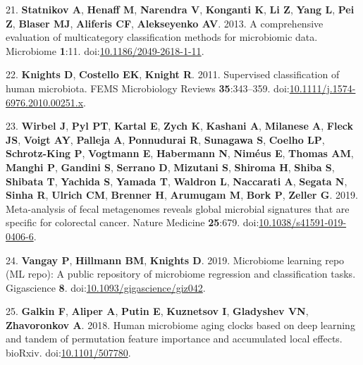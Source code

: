 \documentclass[
  11pt,
]{article}
\begin{document}
\leavevmode\hypertarget{ref-statnikov_comprehensive_2013}{}%
21. \textbf{Statnikov A}, \textbf{Henaff M}, \textbf{Narendra V},
\textbf{Konganti K}, \textbf{Li Z}, \textbf{Yang L}, \textbf{Pei Z},
\textbf{Blaser MJ}, \textbf{Aliferis CF}, \textbf{Alekseyenko AV}. 2013.
A comprehensive evaluation of multicategory classification methods for
microbiomic data. Microbiome \textbf{1}:11.
doi:\href{https://doi.org/10.1186/2049-2618-1-11}{10.1186/2049-2618-1-11}.

\leavevmode\hypertarget{ref-knights_supervised_2011}{}%
22. \textbf{Knights D}, \textbf{Costello EK}, \textbf{Knight R}. 2011.
Supervised classification of human microbiota. FEMS Microbiology Reviews
\textbf{35}:343--359.
doi:\href{https://doi.org/10.1111/j.1574-6976.2010.00251.x}{10.1111/j.1574-6976.2010.00251.x}.

\leavevmode\hypertarget{ref-wirbel_meta-analysis_2019}{}%
23. \textbf{Wirbel J}, \textbf{Pyl PT}, \textbf{Kartal E}, \textbf{Zych
K}, \textbf{Kashani A}, \textbf{Milanese A}, \textbf{Fleck JS},
\textbf{Voigt AY}, \textbf{Palleja A}, \textbf{Ponnudurai R},
\textbf{Sunagawa S}, \textbf{Coelho LP}, \textbf{Schrotz-King P},
\textbf{Vogtmann E}, \textbf{Habermann N}, \textbf{Niméus E},
\textbf{Thomas AM}, \textbf{Manghi P}, \textbf{Gandini S},
\textbf{Serrano D}, \textbf{Mizutani S}, \textbf{Shiroma H},
\textbf{Shiba S}, \textbf{Shibata T}, \textbf{Yachida S}, \textbf{Yamada
T}, \textbf{Waldron L}, \textbf{Naccarati A}, \textbf{Segata N},
\textbf{Sinha R}, \textbf{Ulrich CM}, \textbf{Brenner H},
\textbf{Arumugam M}, \textbf{Bork P}, \textbf{Zeller G}. 2019.
Meta-analysis of fecal metagenomes reveals global microbial signatures
that are specific for colorectal cancer. Nature Medicine
\textbf{25}:679.
doi:\href{https://doi.org/10.1038/s41591-019-0406-6}{10.1038/s41591-019-0406-6}.

\leavevmode\hypertarget{ref-vangay_microbiome_2019}{}%
24. \textbf{Vangay P}, \textbf{Hillmann BM}, \textbf{Knights D}. 2019.
Microbiome learning repo (ML repo): A public repository of microbiome
regression and classification tasks. Gigascience \textbf{8}.
doi:\href{https://doi.org/10.1093/gigascience/giz042}{10.1093/gigascience/giz042}.

\leavevmode\hypertarget{ref-galkin_human_2018}{}%
25. \textbf{Galkin F}, \textbf{Aliper A}, \textbf{Putin E},
\textbf{Kuznetsov I}, \textbf{Gladyshev VN}, \textbf{Zhavoronkov A}.
2018. Human microbiome aging clocks based on deep learning and tandem of
permutation feature importance and accumulated local effects. bioRxiv.
doi:\href{https://doi.org/10.1101/507780}{10.1101/507780}.
\end{document}
